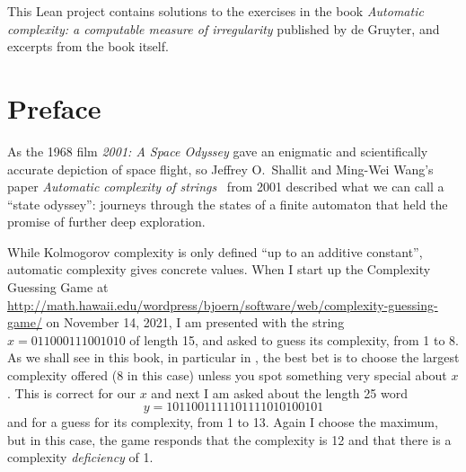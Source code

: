 %
This Lean project contains solutions to the exercises in the book \emph{Automatic complexity: a computable measure of irregularity} published by de Gruyter, and excerpts from the book itself.

\chapter*{Preface}

	As the 1968 film \emph{2001: A Space Odyssey} gave an enigmatic and scientifically accurate depiction of space flight,
	so Jeffrey O.~Shallit and Ming-Wei Wang's paper \emph{Automatic complexity of strings}~\cite{MR1897300} from 2001
	described what we can call a ``state odyssey'':
	journeys through the states of a finite automaton that held the promise of further deep exploration.

	While Kolmogorov complexity is only defined ``up to an additive constant'', automatic complexity gives concrete values. When I start up the
	Complexity Guessing Game at \url{http://math.hawaii.edu/wordpress/bjoern/software/web/complexity-guessing-game/}
	on November 14, 2021, I am presented with the string $x=011000111001010$ of length 15, and asked to guess its complexity,
	from 1 to 8.
	As we shall see in this book, in particular in ,
	the best bet is to choose the largest complexity offered (8 in this case) unless you spot something very special about $x$.
	This is correct for our $x$ and next I am asked about the length 25 word
	\begin{equation}\label{y-word}
		y=1011001111101111010100101
	\end{equation}
	and for a guess for its complexity, from 1 to 13.
	Again I choose the maximum, but in this case, the game responds that the complexity is 12
	and that there is a complexity \emph{deficiency} of 1.

